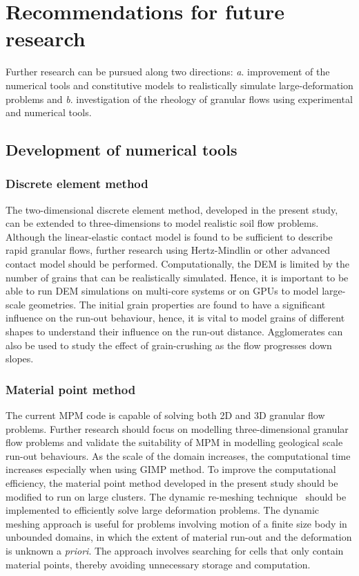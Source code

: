 \section{Recommendations for future research}

Further research can be pursued along two directions: \textit{a}. improvement 
of the numerical tools and constitutive models to realistically simulate 
large-deformation problems and \textit{b}. investigation of the rheology of 
granular flows using experimental and numerical tools.

\subsection{Development of numerical tools}

\subsubsection*{Discrete element method}

The two-dimensional discrete element method, developed in the present study, 
can be extended to three-dimensions to model realistic soil flow 
problems. Although the linear-elastic contact model is found to be sufficient 
to 
describe rapid granular flows, further research using Hertz-Mindlin or other 
advanced contact model should be performed. Computationally, the DEM is limited 
by the number of grains that can be realistically simulated. Hence, it is 
important to be able to run DEM simulations on multi-core systems or on GPUs to 
model large-scale geometries. The initial grain properties are found to have a 
significant influence on the run-out behaviour, hence, it is vital to model 
grains of different shapes to understand their influence on the run-out 
distance. Agglomerates can also be used to study the effect of grain-crushing 
as the flow progresses down slopes.

\subsubsection*{Material point method}

The current MPM code is capable of solving both 2D and 3D granular flow 
problems. Further research should focus on modelling three-dimensional granular 
flow problems and validate the suitability of MPM in modelling geological scale 
run-out behaviours. As the scale of the domain increases, the computational 
time increases especially when using GIMP method. To improve the computational 
efficiency, the material point method developed in the present study should be 
modified to run on large clusters. The dynamic re-meshing 
technique~\citep{Shin2010a} should be implemented to efficiently solve 
large deformation problems. The dynamic meshing approach is useful for problems 
involving motion of a finite size body in unbounded domains, in which the 
extent of material run-out and the deformation is unknown a \textit{priori}. 
The approach involves searching for cells that only contain material points, 
thereby avoiding unnecessary storage and computation. 

